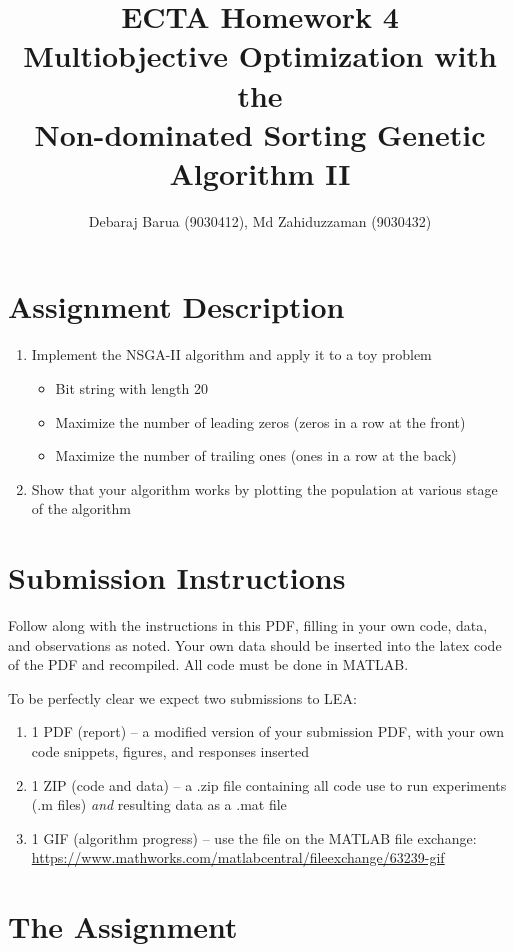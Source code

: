 \documentclass{article}
\title{ECTA Homework 4\\Multiobjective Optimization with the\\Non-dominated Sorting Genetic Algorithm II}
\author{\color{blue}Debaraj Barua (9030412), Md Zahiduzzaman (9030432)}
\begin{document}
\maketitle


\newpage

\section{Assignment Description}
	\begin{enumerate}
		\item Implement the NSGA-II algorithm and apply it to a toy problem
			\begin{itemize}
			\item Bit string with length 20
			\item Maximize the number of leading zeros (zeros in a row at the front)
			\item Maximize the number of trailing ones (ones in a row at the back)
		\end{itemize}
		\item Show that your algorithm works by plotting the population at various stage of the algorithm
	\end{enumerate}

\section{Submission Instructions}
Follow along with the instructions in this PDF, filling in your own code, data, and observations as noted. Your own data should be inserted into the latex code of the PDF and recompiled. All code must be done in MATLAB.

To be perfectly clear we expect two submissions to LEA:
\begin{enumerate}
	\item 1 PDF (report) -- a modified version of your submission PDF, with your own code snippets, figures, and responses inserted
	\item 1 ZIP (code and data)   -- a .zip file containing all code use to run experiments (.m files) \textit{and} resulting data as a .mat file
	\item 1 GIF (algorithm progress) -- use the file on the MATLAB file exchange: \url{https://www.mathworks.com/matlabcentral/fileexchange/63239-gif}
\end{enumerate}


\newpage
\section{The Assignment}
\end{document}

